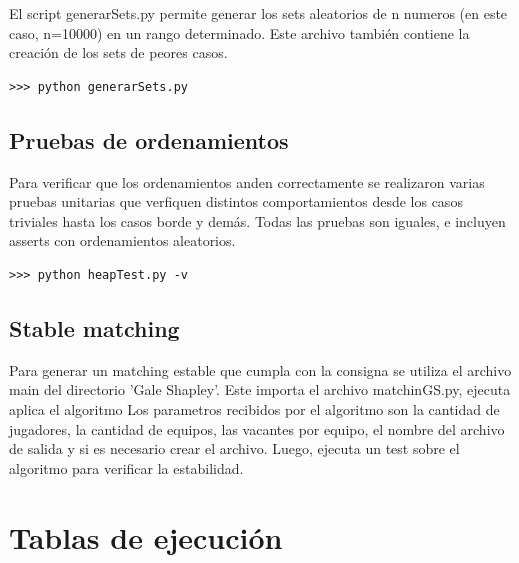 \documentclass[article,a4paper]{article}
\begin{document}
El script generarSets.py permite generar los sets aleatorios de n numeros (en este caso, n=10000) en un rango determinado. Este archivo también contiene la creación de los sets de peores casos.

\begin{verbatim}
>>> python generarSets.py
\end{verbatim}

\subsection{Pruebas de ordenamientos}
Para verificar que los ordenamientos anden correctamente se realizaron varias pruebas unitarias que verfiquen distintos comportamientos desde los casos triviales hasta los casos borde y demás. Todas las pruebas son iguales, e incluyen asserts con ordenamientos aleatorios.

\begin{verbatim}
>>> python heapTest.py -v
\end{verbatim}

\subsection{Stable matching}
Para generar un matching estable que cumpla con la consigna se utiliza el archivo main del directorio 'Gale Shapley'. Este importa el archivo matchinGS.py, ejecuta aplica el algoritmo Los parametros recibidos por el algoritmo son la cantidad de jugadores, la cantidad de equipos, las vacantes por equipo, el nombre del archivo de salida y si es necesario crear el archivo. Luego, ejecuta un test sobre el algoritmo para verificar la estabilidad.

\newpage
\section{Tablas de ejecución}
\end{document}
